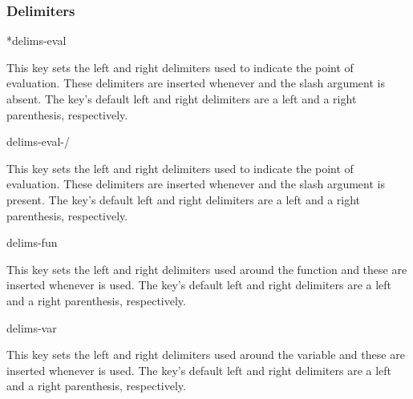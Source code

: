 	\subsubsection*{Delimiters}
	
	\begin{option}*{delims-eval}
		\begin{values}[default = .~\cs{rvert}]
		\end{values}
		This key sets the left and right delimiters used to indicate the point of evaluation. These delimiters are inserted whenever  and the slash argument is absent. The key's default left and right delimiters are a left and a right parenthesis, respectively.
	\end{option}
	
	\clearpage
	
	\begin{option}{delims-eval-/}
		\begin{values}[default = .~\cs{rvert}]
		\end{values}
		This key sets the left and right delimiters used to indicate the point of evaluation. These delimiters are inserted whenever  and the slash argument is present. The key's default left and right delimiters are a left and a right parenthesis, respectively.
	\end{option}
	
	\begin{option}{delims-fun}
		\begin{values}[default = (~)]
		\end{values}
		This key sets the left and right delimiters used around the function and these are inserted whenever  is used. The key's default left and right delimiters are a left and a right parenthesis, respectively.
	\end{option}
	
	\begin{option}{delims-var}
		\begin{values}[default = (~)]
		\end{values}
		This key sets the left and right delimiters used around the variable and these are inserted whenever  is used. The key's default left and right delimiters are a left and a right parenthesis, respectively.
	\end{option}
	
